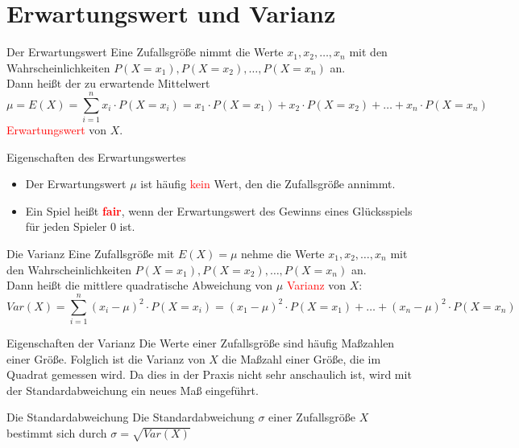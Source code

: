 \section{Erwartungswert und Varianz}
\begin{defi}{Der Erwartungswert}{}
Eine Zufallsgröße nimmt die Werte $x_1, x_2,\ldots , x_n$ mit den Wahrscheinlichkeiten $P(X=x_1), P(X=x_2), \ldots, P(X=x_n)$ an.\\  Dann heißt der zu erwartende Mittelwert \[\mu =E(X) = \sum\limits_{i=1}^n x_i\cdot P(X=x_i)= x_1\cdot P(X=x_1) + x_2\cdot P(X=x_2) +\ldots + x_n \cdot P(X=x_n)\]
    \textcolor{red}{Erwartungswert} von $X$. 
    \end{defi}
    \begin{bem}{Eigenschaften des Erwartungswertes}{}
        \begin{itemize}
            \item Der Erwartungswert $\mu$ ist häufig \textcolor{red}{kein} Wert, den die Zufallsgröße annimmt.
            \item Ein Spiel heißt \textcolor{red}{\textbf{fair}}, wenn der Erwartungswert des Gewinns eines Glücksspiels für jeden Spieler \(0\) ist.
        \end{itemize}
    \end{bem}
    \begin{defi}{Die Varianz}{}
  Eine Zufallsgröße mit $E(X) = \mu$ nehme die Werte $x_1, x_2,\ldots , x_n$ mit den Wahrscheinlichkeiten $P(X=x_1), P(X=x_2), \ldots, P(X=x_n)$ an. \\ 
  Dann heißt die mittlere quadratische Abweichung von $\mu$ \textcolor{red}{Varianz} von $X$: \[Var(X) = \sum\limits_{i=1}^n \left(x_i - \mu\right)^2 \cdot P(X = x_i)= \left(x_1 - \mu\right)^2 \cdot P(X = x_1) + \ldots + \left(x_n - \mu\right)^2 \cdot P(X = x_n)\]
    \end{defi}
    \begin{bem}{Eigenschaften der Varianz}{}
       Die Werte einer Zufallsgröße sind häufig Maßzahlen einer Größe. Folglich ist die Varianz von \(X\) die Maßzahl einer Größe, die im Quadrat gemessen wird. Da dies in der Praxis nicht sehr anschaulich ist, wird mit der Standardabweichung ein neues Maß eingeführt.  
    \end{bem}
    \begin{defi}{Die Standardabweichung}{}
Die Standardabweichung $\sigma$ einer Zufallsgröße $X$ bestimmt sich durch $\sigma = \sqrt{Var(X)}$
    \end{defi}
